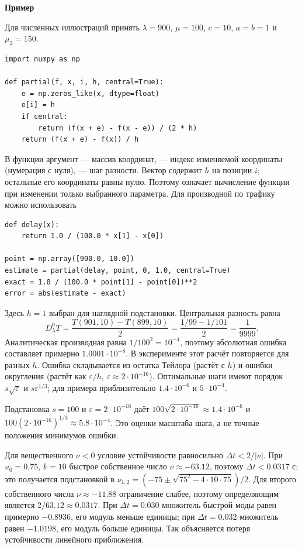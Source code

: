 \documentclass[12pt,a4paper]{article}
\newcommand{\taskhead}[1]{\par\textbf{#1}\par}
\begin{document}
\taskhead{Пример}
Для численных иллюстраций принять $\lambda=900$, $\mu=100$, $c=10$, $a=b=1$ и $\mu_2=150$.
\begin{lstlisting}[style=commands]
import numpy as np

def partial(f, x, i, h, central=True):
    e = np.zeros_like(x, dtype=float)
    e[i] = h
    if central:
        return (f(x + e) - f(x - e)) / (2 * h)
    return (f(x + e) - f(x)) / h
\end{lstlisting}
В функции  аргумент  --- массив координат,
 --- индекс изменяемой координаты (нумерация с нуля),
 --- шаг разности. Вектор  содержит $h$ на позиции $i$;
остальные его координаты равны нулю. Поэтому  означает
вычисление функции при изменении только выбранного параметра.
Для производной по трафику можно использовать
\begin{lstlisting}[style=commands]
def delay(x):
    return 1.0 / (100.0 * x[1] - x[0])

point = np.array([900.0, 10.0])
estimate = partial(delay, point, 0, 1.0, central=True)
exact = 1.0 / (100.0 * point[1] - point[0])**2
error = abs(estimate - exact)
\end{lstlisting}
Здесь $h=1$ выбран для наглядной подстановки. Центральная разность равна
\[
D^0_\lambda T
=\frac{T(901,10)-T(899,10)}{2}
=\frac{1/99-1/101}{2}=\frac1{9999}.
\]
Аналитическая производная равна $1/100^2=10^{-4}$,
поэтому абсолютная ошибка составляет примерно $1.0001\cdot10^{-8}$.
В эксперименте этот расчёт повторяется для разных $h$.
Ошибка складывается из остатка Тейлора (растёт с $h$) и ошибки округления
(растёт как $\varepsilon/h$, $\varepsilon\approx2\cdot10^{-16}$).
Оптимальные шаги имеют порядок $s\sqrt\varepsilon$ и $s\varepsilon^{1/3}$;
для примера приблизительно $1.4\cdot10^{-6}$ и $5\cdot10^{-4}$.

Подстановка $s=100$ и $\varepsilon=2\cdot10^{-16}$ даёт
$100\sqrt{2\cdot10^{-16}}\approx1.4\cdot10^{-6}$ и
$100(2\cdot10^{-16})^{1/3}\approx5.8\cdot10^{-4}$.
Это оценки масштаба шага, а не точные положения минимумов ошибки.

Для вещественного $\nu<0$ условие устойчивости равносильно
$\Delta t<2/|\nu|$. При $u_0=0.75$, $k=10$ быстрое собственное число
$\nu\approx-63.12$, поэтому $\Delta t<0.0317$ с;
это получается подстановкой в
$\nu_{1,2}=(-75\pm\sqrt{75^2-4\cdot10\cdot75})/2$.
Для второго собственного числа $\nu\approx-11.88$ ограничение слабее,
поэтому определяющим является $2/63.12\approx0.0317$.
При $\Delta t=0.030$ множитель быстрой моды равен примерно $-0.8936$,
его модуль меньше единицы; при $\Delta t=0.032$ множитель равен $-1.0198$,
его модуль больше единицы. Так объясняется потеря устойчивости линейного приближения.
\end{document}
